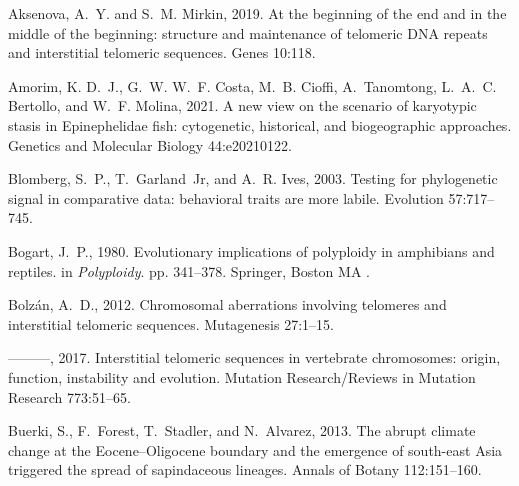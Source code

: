 \documentclass[a4paper, 12pt]{article}
\begin{document}
\begin{thebibliography}{73}
\providecommand{\natexlab}[1]{#1}
\providecommand{\url}[1]{\texttt{#1}}
\providecommand{\urlprefix}{URL }

Aksenova, A.~Y. and S.~M. Mirkin, 2019.
\newblock At the beginning of the end and in the middle of the beginning:
  structure and maintenance of telomeric {DNA} repeats and interstitial telomeric
  sequences.
\newblock Genes 10:118.

Amorim, K. D.~J., G.~W. W.~F. Costa, M.~B. Cioffi, A.~Tanomtong, L.~A.~C.
  Bertollo, and W.~F. Molina, 2021.
\newblock A new view on the scenario of karyotypic stasis in {E}pinephelidae
  fish: cytogenetic, historical, and biogeographic approaches.
\newblock Genetics and Molecular Biology 44:e20210122.

Blomberg, S.~P., T.~Garland~Jr, and A.~R. Ives, 2003.
\newblock Testing for phylogenetic signal in comparative data: behavioral
  traits are more labile.
\newblock Evolution 57:717--745.

Bogart, J.~P., 1980.
\newblock Evolutionary implications of polyploidy in amphibians and reptiles.
  in \textit{Polyploidy}. pp. 341--378.
\newblock Springer, Boston MA .

Bolz{\'a}n, A.~D., 2012.
\newblock Chromosomal aberrations involving telomeres and interstitial
  telomeric sequences.
\newblock Mutagenesis 27:1--15.

---{}---{}---, 2017.
\newblock Interstitial telomeric sequences in vertebrate chromosomes: origin,
  function, instability and evolution.
\newblock Mutation Research/Reviews in Mutation Research 773:51--65.

Buerki, S., F.~Forest, T.~Stadler, and N.~Alvarez, 2013.
\newblock The abrupt climate change at the {E}ocene--{O}ligocene boundary and the
  emergence of south-east {A}sia triggered the spread of sapindaceous lineages.
\newblock Annals of Botany 112:151--160.


\end{thebibliography}
\end{document}
